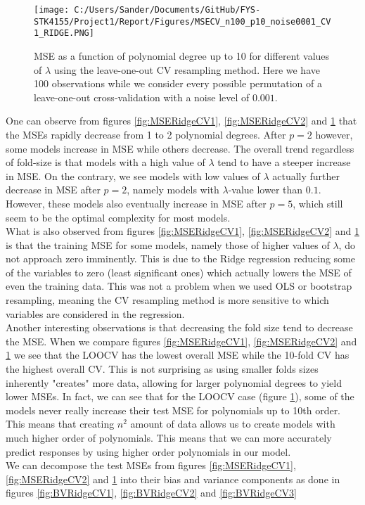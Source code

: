 \documentclass[12pt,a4paper]{article}
\begin{document}
\begin{figure}[H]
\centering
\texttt{[image: C:/Users/Sander/Documents/GitHub/FYS-STK4155/Project1/Report/Figures/MSECV\_n100\_p10\_noise0001\_CV1\_RIDGE.PNG]}
\caption{\label{fig:MSERidgeCV3} MSE as a function of polynomial degree up to 10 for different values of $\lambda$ using the leave-one-out CV resampling method. Here we have 100 observations while we consider every possible permutation of a leave-one-out cross-validation with a noise level of $0.001$.}
\end{figure}

\noindent One can observe from figures \ref{fig:MSERidgeCV1}, \ref{fig:MSERidgeCV2} and \ref{fig:MSERidgeCV3} that the MSEs rapidly decrease from 1 to 2 polynomial degrees. After $p = 2$ however, some models increase in MSE while others decrease. The overall trend regardless of fold-size is that models with a high value of $\lambda$ tend to have a steeper increase in MSE. On the contrary, we see models with low values of $\lambda$ actually further decrease in MSE after $p = 2$, namely models with $\lambda$-value lower than $0.1$. However, these models also eventually increase in MSE after $p = 5$, which still seem to be the optimal complexity for most models. 
\\
What is also observed from figures \ref{fig:MSERidgeCV1}, \ref{fig:MSERidgeCV2} and \ref{fig:MSERidgeCV3} is that the training MSE for some models, namely those of higher values of $\lambda$, do not approach zero imminently. This is due to the Ridge regression reducing some of the variables to zero (least significant ones) which actually lowers the MSE of even the training data. This was not a problem when we used OLS or bootstrap resampling, meaning the CV resampling method is more sensitive to which variables are considered in the regression. 
\\
Another interesting observations is that decreasing the fold size tend to decrease the MSE. When we compare figures \ref{fig:MSERidgeCV1}, \ref{fig:MSERidgeCV2} and \ref{fig:MSERidgeCV3} we see that the LOOCV has the lowest overall MSE while the 10-fold CV has the highest overall CV. This is not surprising as using smaller folds sizes inherently "creates" more data, allowing for larger polynomial degrees to yield lower MSEs. In fact, we can see that for the LOOCV case (figure \ref{fig:MSERidgeCV3}), some of the models never really increase their test MSE for polynomials up to 10th order. This means that creating $n^2$ amount of data allows us to create models with much higher order of polynomials. This means that we can more accurately predict responses by using higher order polynomials in our model.
\\
We can decompose the test MSEs from figures \ref{fig:MSERidgeCV1}, \ref{fig:MSERidgeCV2} and \ref{fig:MSERidgeCV3} into their bias and variance components as done in figures \ref{fig:BVRidgeCV1}, \ref{fig:BVRidgeCV2} and \ref{fig:BVRidgeCV3}
\end{document}
